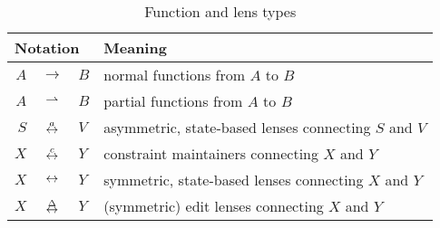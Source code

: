 \begin{table}
    \centering
    \begin{tabular}{r@{}c@{}l|l}
        \multicolumn{3}{l|}{Notation} & Meaning \\
        \hline
        $A$ & ${}\to       {}$ & $B$ & normal functions from $A$ to $B$ \\
        $A$ & ${}\rightharpoonup{}$ & $B$ & partial functions from $A$ to $B$ \\
        $S$ & ${}\overset{a}{\leftrightarrow}    {}$ & $V$ & asymmetric, state-based lenses connecting $S$ and $V$ \\
        $X$ & ${}\overset{c}{\leftrightarrow}   {}$ & $Y$ & constraint maintainers connecting $X$ and $Y$ \\
        $X$ & ${}\leftrightarrow     {}$ & $Y$ & symmetric, state-based lenses connecting $X$ and $Y$ \\
        $X$ & ${}\overset{\Delta}{\leftrightarrow}    {}$ & $Y$ & (symmetric) edit lenses connecting $X$ and $Y$
    \end{tabular}
    \caption{Function and lens types}
    \label{tab:arrows}
\end{table}
